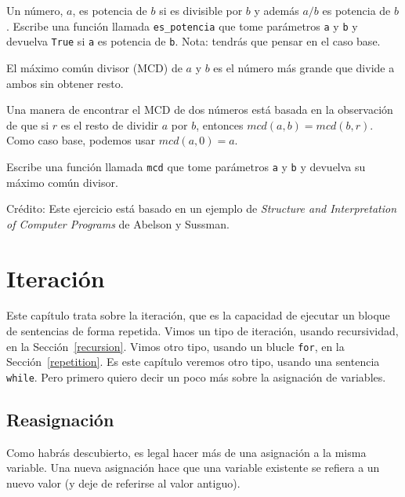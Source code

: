 \documentclass[10pt]{book}
\begin{document}
\begin{exercise}

Un número, $a$, es potencia de $b$ si es divisible por $b$
y además $a/b$ es potencia de $b$.  Escribe una función llamada
\verb"es_potencia" que tome parámetros {\tt a} y {\tt b}
y devuelva {\tt True} si {\tt a} es potencia de {\tt b}.
Nota: tendrás que pensar en el caso base.

\end{exercise}


\begin{exercise}

El máximo común divisor (MCD) de $a$ y $b$ es el número más grande
que divide a ambos sin obtener resto.

Una manera de encontrar el MCD de dos números está basada en la observación
de que si $r$ es el resto de dividir $a$ por $b$, entonces $mcd(a,
b) = mcd(b, r)$.  Como caso base, podemos usar $mcd(a, 0) = a$.

Escribe una función llamada
\verb"mcd" que tome parámetros {\tt a} y {\tt b}
y devuelva su máximo común divisor.

Crédito: Este ejercicio está basado en un ejemplo de
{\em Structure and Interpretation of Computer Programs} de Abelson y Sussman.

\end{exercise}


\chapter{Iteración}

Este capítulo trata sobre la iteración, que es la capacidad de ejecutar
un bloque de sentencias de forma repetida.  Vimos un tipo de iteración,
usando recursividad, en la Sección~\ref{recursion}.
Vimos otro tipo, usando un blucle {\tt for},
en la Sección~\ref{repetition}.  Es este capítulo veremos otro
tipo, usando una sentencia {\tt while}.
Pero primero quiero decir un poco más sobre la asignación de variables.


\section{Reasignación}

Como habrás descubierto, es legal hacer más de una
asignación a la misma variable.  Una nueva asignación hace que una variable existente
se refiera a un nuevo valor (y deje de referirse al valor antiguo).
\end{document}
